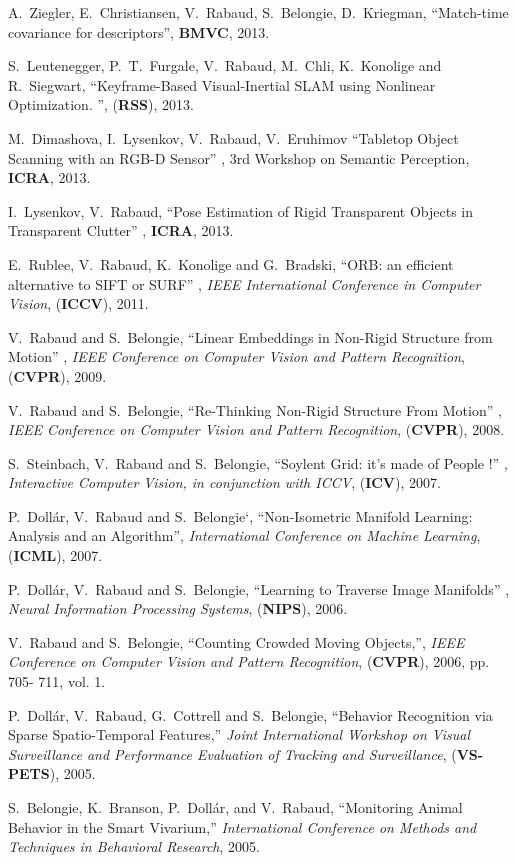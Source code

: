 A.~Ziegler, E.~Christiansen, V.~Rabaud, S.~Belongie, D.~Kriegman, ``Match-time covariance for 
descriptors'', \textbf{BMVC}, 2013.

S.~Leutenegger, P.~T.~Furgale, V.~Rabaud, M.~Chli, K.~Konolige and R.~Siegwart, ``Keyframe-Based Visual-Inertial SLAM using Nonlinear Optimization.
'', (\textbf{RSS}), 2013.

M.~Dimashova, I.~Lysenkov, V.~Rabaud, V.~Eruhimov ``Tabletop Object Scanning with an RGB-D Sensor'' , 3rd Workshop 
on Semantic Perception, \textbf{ICRA}, 2013.

I.~Lysenkov, V.~Rabaud, ``Pose Estimation of Rigid Transparent Objects in Transparent Clutter'' , \textbf{ICRA}, 2013.

E.~Rublee, V.~Rabaud, K.~Konolige and G.~Bradski, ``ORB: an efficient alternative to SIFT or SURF'' , {\em IEEE 
International Conference in Computer Vision}, (\textbf{ICCV}), 2011.

V.~Rabaud and S.~Belongie, ``Linear Embeddings in Non-Rigid Structure from Motion'' , {\em IEEE Conference on Computer 
Vision and Pattern Recognition}, (\textbf{CVPR}), 2009.

V.~Rabaud and S.~Belongie, ``Re-Thinking Non-Rigid Structure From Motion'' , {\em IEEE Conference on Computer Vision and 
Pattern Recognition}, (\textbf{CVPR}), 2008.

S.~Steinbach, V.~Rabaud and S.~Belongie, ``Soylent Grid: it's made of People !'' , {\em Interactive Computer Vision, in 
conjunction with ICCV}, (\textbf{ICV}), 2007.

P.~Doll\'ar, V.~Rabaud and S.~Belongie`, ``Non-Isometric Manifold Learning: Analysis and an Algorithm'', {\em 
International Conference on Machine Learning}, (\textbf{ICML}), 2007.

P.~Doll\'ar, V.~Rabaud and S.~Belongie, ``Learning to Traverse Image Manifolds'' , {\em Neural Information Processing 
Systems}, (\textbf{NIPS}), 2006. 

V.~Rabaud and S.~Belongie, ``Counting Crowded Moving Objects,'', {\em IEEE Conference on Computer Vision and Pattern 
Recognition}, (\textbf{CVPR}), 2006, pp. 705- 711, vol. 1.

P.~Doll\'ar, V.~Rabaud, G.~Cottrell and S.~Belongie, ``Behavior Recognition via Sparse Spatio-Temporal Features,'' {\em 
Joint International Workshop on Visual Surveillance and Performance Evaluation of Tracking and Surveillance}, 
(\textbf{VS-PETS}), 2005. 

S.~Belongie, K.~Branson, P.~Doll\'ar, and V.~Rabaud, ``Monitoring Animal Behavior in the Smart Vivarium,'' {\em 
International Conference on Methods and Techniques in Behavioral Research}, 2005.

